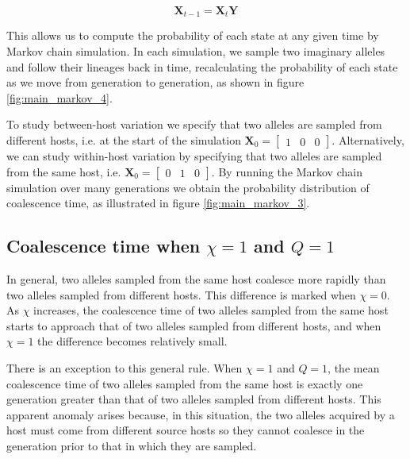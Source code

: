 \documentclass[_main.tex]{subfiles}
\begin{document}
 \begin{equation*} 
\textbf{X}_{t-1} =
\textbf{X}_{t} \textbf{Y}
\label{eq:supp_markov}
\end{equation*}

This allows us to compute the probability of each state at any given time by Markov chain simulation.  In each simulation, we sample two imaginary alleles and follow their lineages back in time, recalculating the probability of each state as we move from generation to generation, as shown in figure \ref{fig:main_markov_4}.

To study between-host variation we specify that two alleles are sampled from different hosts, i.e. at the start of the simulation $\textbf{X}_0 = \begin{bmatrix} 1 & 0 & 0 \end{bmatrix}$.  Alternatively, we can study within-host variation by specifying that two alleles are sampled from the same host, i.e. $\textbf{X}_0 = \begin{bmatrix} 0 & 1 & 0 \end{bmatrix}$.   By running the Markov chain simulation over many generations we obtain the probability distribution of coalescence time, as illustrated in figure \ref{fig:main_markov_3}.   


\subsection{Coalescence time when $\chi =1$ and $Q =1$}
\label{supp_anomaly}

In general, two alleles sampled from the same host coalesce more rapidly than two alleles sampled from different hosts.   This difference is marked when $\chi=0$.  As $\chi$ increases, the coalescence time of two alleles sampled from the same host starts to approach that of two alleles sampled from different hosts, and when $\chi=1$ the difference becomes relatively small.  

There is an exception to this general rule.  When $\chi=1$ and $Q=1$, the mean coalescence time of two alleles sampled from the same host is exactly one generation greater than that of two alleles sampled from different hosts.  This apparent anomaly arises because, in this situation, the two alleles acquired by a host must come from different source hosts so they cannot coalesce in the generation prior to that in which they are sampled.

\end{document}
